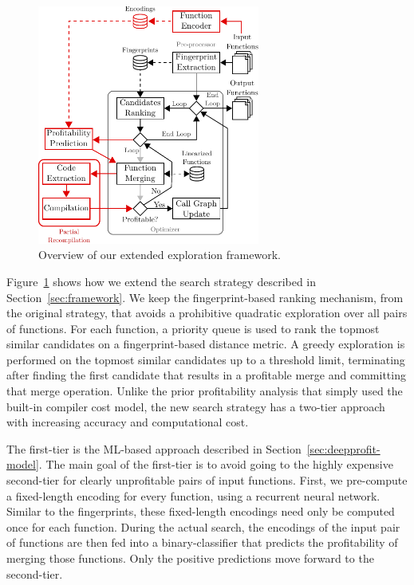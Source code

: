 \begin{figure}[h]
  \centering
  \includegraphics[width=0.65\textwidth]{src/deeplearning/figs/func-merge-opt-new-arch.pdf}
  \caption{Overview of our extended exploration framework.}
  \label{fig:func-merge-opt-new-arch}
\end{figure}

Figure~\ref{fig:func-merge-opt-new-arch} shows how we extend the search strategy described in Section~\ref{sec:framework}.
We keep the fingerprint-based ranking mechanism, from the original strategy, that avoids a prohibitive quadratic exploration over all pairs of functions.
For each function, a priority queue is used to rank the topmost similar candidates on a fingerprint-based distance metric.
A greedy exploration is performed on the topmost similar candidates up to a threshold limit, terminating after finding the first candidate that results in a profitable merge and committing that merge operation.
Unlike the prior profitability analysis that simply used the built-in compiler cost model, the new search strategy has a two-tier approach with increasing accuracy and computational cost.

The first-tier is the ML-based approach described in Section~\ref{sec:deepprofit-model}.
The main goal of the first-tier is to avoid going to the highly expensive second-tier for clearly unprofitable pairs of input functions. 
First, we pre-compute a fixed-length encoding for every function, using a recurrent neural network.
Similar to the fingerprints, these fixed-length encodings need only be computed once for each function.
During the actual search, the encodings of the input pair of functions are then fed into a binary-classifier that predicts the profitability of merging those functions.
Only the positive predictions move forward to the second-tier.

